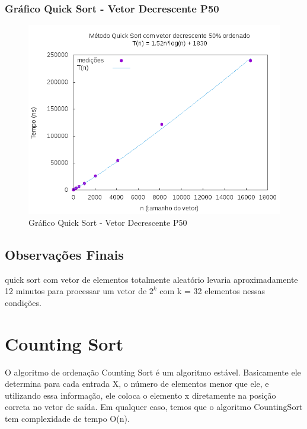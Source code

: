 \documentclass[12pt,a4paper,twoside]{report}
\begin{document}
\subsection{Gráfico Quick Sort - Vetor Decrescente P50}
\begin{figure}[H]
    \centering
    \includegraphics[width=0.7\linewidth]{graficos/QuickSort/vIntDecrescenteP50/vIntDecrescenteP50.png}
  \caption{Gráfico Quick Sort - Vetor Decrescente P50}
\end{figure}
\section{Observações Finais}
quick sort com vetor de elementos totalmente aleatório levaria aproximadamente 12 minutos para processar um vetor de $2^k$ com k = 32 elementos nessas condições.

\chapter{Counting Sort}
O algoritmo de ordenação Counting Sort é um algoritmo estável. Basicamente ele determina para cada entrada X, o número de elementos menor que ele, e utilizando essa informação, ele coloca o elemento x diretamente na posição correta no vetor de saída.
Em qualquer caso, temos que o algoritmo CountingSort tem complexidade de tempo O(n).
\end{document}
